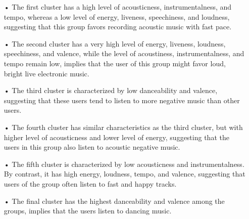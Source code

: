 \begin{itemize}
\item[•] The first cluster has a high level of acousticness, instrumentalness,  and tempo, whereas a low level of energy, liveness, speechiness, and loudness, suggesting that this group favors recording acoustic music with fast pace.

\item[•] The second cluster has a very high level of energy, liveness, loudness, speechiness, and valence, while the level of acoustiness, instrumentalness, and tempo remain low, implies that the user of this group might favor loud, bright live electronic music.

\item[•] The third cluster is characterized by low danceability and valence, suggesting that these users tend to listen to more negative music than other users.

\item[•] The fourth cluster has similar characteristics as the third cluster, but with higher level of acousticness and lower level of energy, suggesting that the users in this group also listen to acoustic negative music.

\item[•] The fifth cluster is characterized by low acousticness and instrumentalness. By contrast, it has high energy, loudness, tempo, and valence, suggesting that users of the group often listen to fast and happy tracks.

\item[•] The final cluster has the highest danceability and valence among the groups, implies that the users listen to dancing music. 
\end{itemize} 



